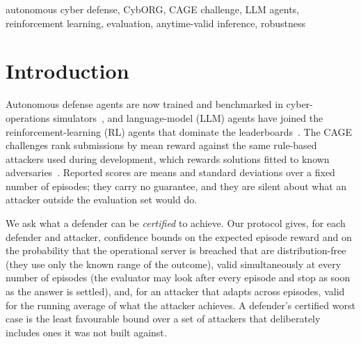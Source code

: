 \documentclass[conference,compsoc]{IEEEtran}
\begin{document}
\begin{IEEEkeywords}
autonomous cyber defense, CybORG, CAGE challenge, LLM agents, reinforcement learning,
evaluation, anytime-valid inference, robustness
\end{IEEEkeywords}

\section{Introduction}
Autonomous defense agents are now trained and benchmarked in cyber-operations
simulators~\cite{standen2021cyborg}, and language-model (LLM) agents have joined the
reinforcement-learning (RL) agents that dominate the leaderboards~\cite{castro2025llm}.
The CAGE challenges rank submissions by mean reward against the same rule-based
attackers used during development, which rewards solutions fitted to known
adversaries~\cite{king2025graph}. Reported scores are means and standard deviations over
a fixed number of episodes; they carry no guarantee, and they are silent about what an
attacker outside the evaluation set would do.

We ask what a defender can be \emph{certified} to achieve. Our protocol gives, for each
defender and attacker, confidence bounds on the expected episode reward and on the
probability that the operational server is breached that are distribution-free (they use
only the known range of the outcome), valid simultaneously at every number of episodes
(the evaluator may look after every episode and stop as soon as the answer is settled),
and, for an attacker that adapts across episodes, valid for the running average of what
the attacker achieves. A defender's certified worst case is the least favourable bound
over a set of attackers that deliberately includes ones it was not built against.
\end{document}
